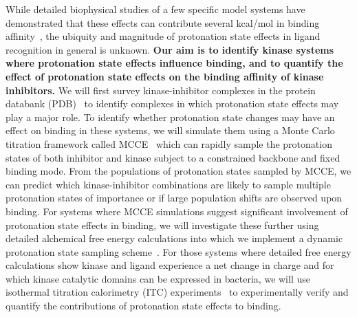\documentclass[10pt,final]{article}
\begin{document}
While detailed biophysical studies of a few specific model systems have demonstrated that these effects can contribute several kcal/mol in binding affinity~\autocite{Dullweber2001a,Aleksandrov2007a,Czodrowski2007a,Steuber2007a,Czodrowski2007b},
the ubiquity and magnitude of protonation state effects in ligand recognition in general is unknown.
%
\textbf{Our aim is to identify kinase systems where protonation state effects influence binding, and to quantify the effect of protonation state effects on the binding affinity of kinase inhibitors.}
%
We will first survey kinase-inhibitor complexes in the protein databank (PDB)~\autocite{Berman2000a} to identify complexes in which protonation state effects may play a major role.
%
To identify whether protonation state changes may have an effect on binding in these systems, we will simulate them using a Monte Carlo titration framework called MCCE~\autocite{Song2009a} which can rapidly sample the protonation states of both inhibitor and kinase subject to a constrained backbone and fixed binding mode.
%
From the populations of protonation states sampled by MCCE, we can predict which kinase-inhibitor combinations are likely to sample multiple protonation states of importance or if large population shifts are observed upon binding.
%
For systems where MCCE simulations suggest significant involvement of protonation state effects in binding, we will investigate these further using detailed alchemical free energy calculations into which we implement a dynamic protonation state sampling scheme~\autocite{Mongan2004a,Stern2007a,Nilmeier2011a}.
For those systems where detailed free energy calculations show kinase and ligand experience a net change in charge and for which kinase catalytic domains can be expressed in bacteria, we will use isothermal titration calorimetry (ITC) experiments~\autocite{Baker1996a,Neeb2014a} to experimentally verify and quantify the contributions of protonation state effects to binding.
%
\end{document}
